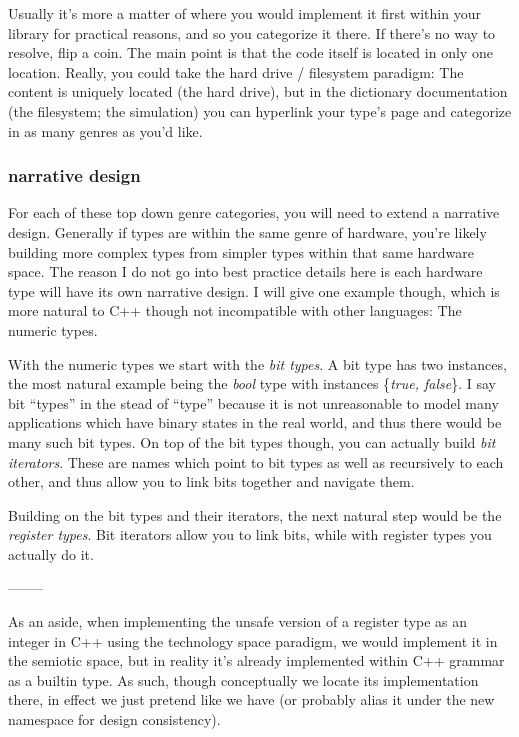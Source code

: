 \documentclass[twoside]{article}
\begin{document}
Usually it's more a matter of where you would implement it first within your library for practical reasons, and so you
categorize it there.  If there's no way to resolve, flip a coin.  The main point is that the code itself is located
in only one location.  Really, you could take the hard drive / filesystem paradigm: The content is uniquely located
(the hard drive), but in the dictionary documentation (the filesystem; the simulation) you can hyperlink your
type's page and categorize in as many genres as you'd like.

\subsubsection*{narrative design}

For each of these top down genre categories, you will need to extend a narrative design. Generally if types are
within the same genre of hardware, you're likely building more complex types from simpler types within that same
hardware space. The reason I do not go into best practice details here is each hardware type will have its own
narrative design. I will give one example though, which is more natural to C++ though not incompatible with other
languages: The numeric types.

With the numeric types we start with the \emph{bit types}. A bit type has two instances, the most natural example
being the \emph{bool} type with instances \{\emph{true, false}\}. I say bit ``types'' in the stead of ``type'' because
it is not unreasonable to model many applications which have binary states in the real world, and thus there would
be many such bit types. On top of the bit types though, you can actually build \emph{bit iterators}. These are names
which point to bit types as well as recursively to each other, and thus allow you to link bits together and navigate
them.

Building on the bit types and their iterators, the next natural step would be the \emph{register types}. Bit iterators
allow you to link bits, while with register types you actually do it.

--------

As an aside, when implementing the unsafe version of a register type as an integer in C++ using the technology space paradigm,
we would implement it in the semiotic space, but in reality it's already implemented within C++ grammar as a builtin type.
As such, though conceptually we locate its implementation there, in effect we just pretend like we have (or probably alias
it under the new namespace for design consistency).
\end{document}
